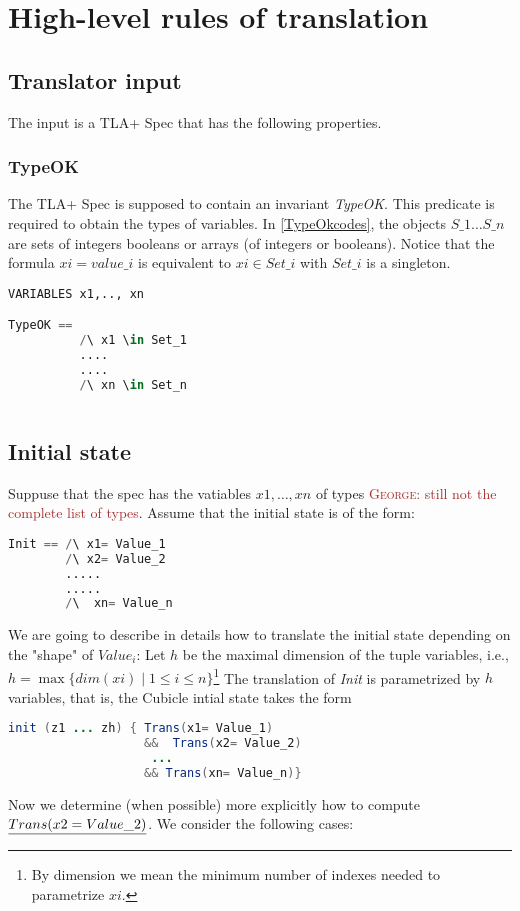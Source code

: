 \documentclass{article}
\theoremstyle{plain}
\numberwithin{equation}{section}
\newcommand{\george}[1]{\textcolor{brown}{\textsc{George: } {\sf #1}}}
\renewcommand{\leq}{\leqslant}
\begin{document}
\large

\section{High-level rules of translation }
  
\subsection{Translator input}
The input is a TLA+ Spec that has the following properties. 

\subsubsection{TypeOK} The TLA+ Spec is supposed to contain an invariant \emph{TypeOK}.  This predicate is required to obtain the types of variables. In \eqref{TypeOkcodes}, the objects $S\_1 \dots S\_n$ are sets of integers booleans or arrays (of integers or booleans). Notice that the formula $xi=value\_i$ is equivalent to $xi \in Set\_i$ with $Set\_i$ is a singleton. 


\begin{lstlisting}[language=Python,caption={The explicit form of the predicate \emph{TypeOK}.}, label={TypeOkcodes}] 
VARIABLES x1,.., xn

TypeOK == 
          /\ x1 \in Set_1
          ....
          ....
          /\ xn \in Set_n
 
\end{lstlisting}



\subsection{Initial state} 
Suppuse that the spec has the vatiables $x1, \dots, xn$ of types \george{still not the complete list of types}.  
Assume that the initial state is of the form: 

\begin{lstlisting}[language=Python]
Init == /\ x1= Value_1  
        /\ x2= Value_2  
        .....
        .....
        /\  xn= Value_n   
\end{lstlisting}

We are going to describe in details how to translate the initial state depending on the "shape" of $Value_i$: Let $h$ be the maximal dimension of the tuple variables, i.e., $h=\max\{dim(xi)\mid 1\leq i \leq n\}$\footnote{By dimension we mean the minimum number of indexes needed to parametrize $xi$.} The translation of \emph{Init}  is parametrized by $h$ variables, that is, the Cubicle intial state takes the form 
\begin{lstlisting}[language=java]
init (z1 ... zh) { Trans(x1= Value_1) 
                   &&  Trans(x2= Value_2) 
                    ... 
                   && Trans(xn= Value_n)}
\end{lstlisting}
  Now we determine (when possible) more explicitly  how to compute  $\emph{Trans(x2= Value\_2)}$. We consider the following cases: 
\end{document}
